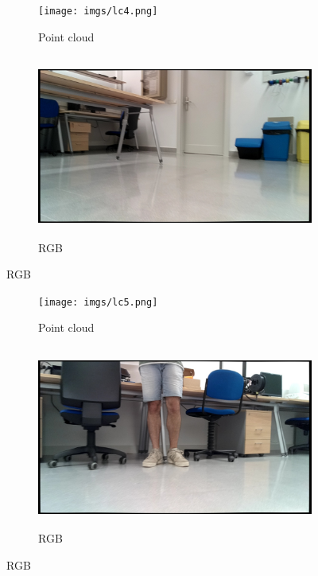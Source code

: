 \begin{figure}[H]
  \centering
  \begin{subfigure}[b]{0.47\textwidth}
    \centering
    \texttt{[image: imgs/lc4.png]}
    \caption{Point cloud}

  \end{subfigure}
  \hfill
  \begin{subfigure}[b]{0.47\textwidth}
    \centering
    \includegraphics[height=6cm,width=\textwidth]{imgs/lr4.png}
    \caption{RGB}

  \end{subfigure}
\end{figure}

\begin{figure}[H]
  \centering
  \begin{subfigure}[b]{0.47\textwidth}
    \centering
    \texttt{[image: imgs/lc5.png]}
    \caption{Point cloud}

  \end{subfigure}
  \hfill
  \begin{subfigure}[b]{0.47\textwidth}
    \centering
    \includegraphics[height=6cm,width=\textwidth]{imgs/lr5.png}
    \caption{RGB}

  \end{subfigure}
\end{figure}

